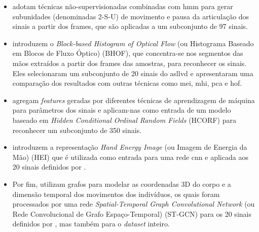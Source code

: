 \begin{itemize}    

    \item {} adotam técnicas não-supervisionadas combinadas com \acrfull{hmm} para gerar subunidades (denominadas 2-S-U) de movimento e pausa da articulação dos sinais a partir dos frames, que são aplicadas a um subconjunto de 97 sinais. 

    \item {} introduzem o \textit{Block-based Histogram of Optical Flow} (ou Histograma Baseado em Blocos de Fluxo Óptico) (BHOF), que concentra-se nos segmentos das mãos extraídos a partir dos frames das amostras, para reconhecer os sinais. Eles selecionaram um subconjunto de 20 sinais do \acrshort{asllvd} e apresentaram uma comparação dos resultados com outras técnicas como \acrfull{mei}, \acrfull{mhi}, \acrfull{pca} e \acrfull{hof}.

    \item {} agregam \textit{features} geradas por diferentes técnicas de aprendizagem de máquina para parâmetros dos sinais e aplicam-nas como entrada de um modelo baseado em \textit{Hidden Conditional Ordinal Random Fields} (HCORF) para reconhecer um subconjunto de 350 sinais.

    \item {} introduzem a representação \textit{Hand Energy Image} (ou Imagem de Energia da Mão) (HEI) que é utilizada como entrada para uma rede \acrshort{cnn} e aplicada aos 20 sinais definidos por .

    \item Por fim,  utilizam grafos para modelar as coordenadas 3D do corpo e a dimensão temporal dos movimentos dos indivíduos, os quais foram processados por uma rede \textit{Spatial-Temporal Graph Convolutional Network} (ou Rede Convolucional de Grafo Espaço-Temporal) (ST-GCN) para os 20 sinais definidos por , mas também para o \textit{dataset} inteiro.
\end{itemize}


